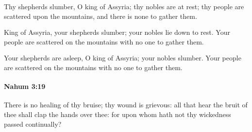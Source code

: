 			\begin{versebox}
					\item[BHS] 
					\item[LXX] 
					\item[ASV] Thy shepherds slumber, O king of Assyria; thy nobles are at rest; thy people are scattered upon the mountains, and there is none to gather them.
					\item[NIV] King of Assyria, your shepherds slumber; your nobles lie down to rest. Your people are scattered on the mountains with no one to gather them.
					\item[NRSV] Your shepherds are asleep, O king of Assyria; your nobles slumber. Your people are scattered on the mountains with no one to gather them.
			\end{versebox}

		\paragraph{Nahum 3:19} %
			\label{NAHUM-3-19}

			There is no healing of thy bruise; thy wound is grievous: all that hear the bruit of thee shall clap the hands over thee: for upon whom hath not thy wickedness passed continually?

